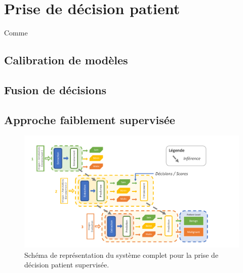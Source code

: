 \chapter{Prise de décision patient}
\label{chap:chapter_6}
\chapterintro
Comme 	
\newpage

\section{Calibration de modèles}
\section{Fusion de décisions}
\section{Approche faiblement supervisée}
\begin{figure}[H]
    \centering
    \includegraphics[width=\linewidth]{contents/chapter_6/resources/scheme_patient_decision.pdf}
    \caption{Schéma de représentation du système complet pour la prise de décision patient supervisée.}
    \label{fig:scheme_patient_decision}
\end{figure}\par
